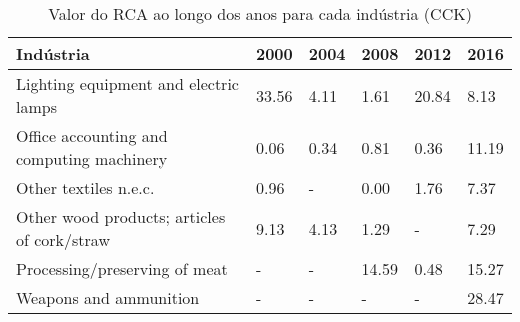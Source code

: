 \begin{table}
\centering
\caption{Valor do RCA ao longo dos anos para cada indústria (CCK)}
\begin{tabular}{p{6cm}p{1.5cm}p{1.5cm}p{1.5cm}p{1.5cm}p{1.5cm}}
\toprule
                                  Indústria &  2000 & 2004 &  2008 &  2012 &  2016 \\
\midrule
      Lighting equipment and electric lamps & 33.56 & 4.11 &  1.61 & 20.84 &  8.13 \\
  Office accounting and computing machinery &  0.06 & 0.34 &  0.81 &  0.36 & 11.19 \\
                      Other textiles n.e.c. &  0.96 &    - &  0.00 &  1.76 &  7.37 \\
Other wood products; articles of cork/straw &  9.13 & 4.13 &  1.29 &     - &  7.29 \\
              Processing/preserving of meat &     - &    - & 14.59 &  0.48 & 15.27 \\
                     Weapons and ammunition &     - &    - &     - &     - & 28.47 \\
\bottomrule
\end{tabular}
\end{table}
